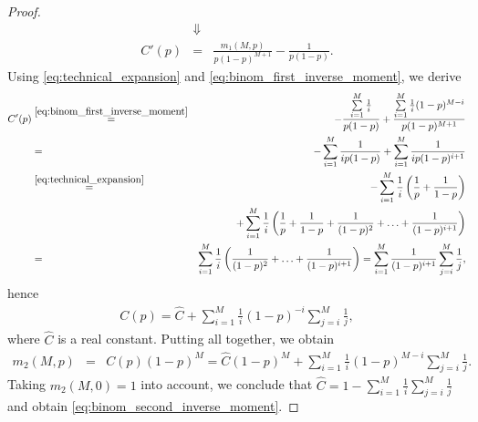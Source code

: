 \begin{proof}
\begin{eqnarray*}
        &\Downarrow&\\
        C'(p) &=& \frac{m_1(M,p)}{p(1-p)^{M+1}} - \frac{1}{p(1-p)}.
    \end{eqnarray*}
    Using \eqref{eq:technical_expansion} and \eqref{eq:binom_first_inverse_moment}, we derive
    \begin{eqnarray*}
        C'(p) &\overset{\eqref{eq:binom_first_inverse_moment}}{=}& -\frac{\sum\limits_{i=1}^M\frac{1}{i}}{p(1-p)} + \frac{\sum\limits_{i=1}^M\frac{1}{i}(1-p)^{M-i}}{p(1-p)^{M+1}}\\
        &=& -\sum\limits_{i=1}^M \frac{1}{ip(1-p)} + \sum\limits_{i=1}^M\frac{1}{ip(1-p)^{i+1}}\\
        &\overset{\eqref{eq:technical_expansion}}{=}& -\sum\limits_{i=1}^M\frac{1}{i}\left(\frac{1}{p} + \frac{1}{1-p}\right)\\
        &&\quad + \sum\limits_{i=1}^M\frac{1}{i}\left(\frac{1}{p} + \frac{1}{1-p} + \frac{1}{(1-p)^2} + \ldots + \frac{1}{(1-p)^{i+1}}\right)\\
        &=& \sum\limits_{i=1}^M\frac{1}{i}\left(\frac{1}{(1-p)^2} + \ldots + \frac{1}{(1-p)^{i+1}}\right) = \sum\limits_{i=1}^M \frac{1}{(1-p)^{i+1}}\sum\limits_{j=i}^M\frac{1}{j},
    \end{eqnarray*}
    hence 
    \begin{eqnarray*}
        C(p) = \hat{C} + \sum\limits_{i=1}^M\frac{1}{i}(1-p)^{-i}\sum\limits_{j=i}^M\frac{1}{j},
    \end{eqnarray*}
    where $\hat{C}$ is a real constant. Putting all together, we obtain
    \begin{eqnarray*}
        m_2(M,p) &=& C(p)(1-p)^M = \hat{C}(1-p)^M + \sum\limits_{i=1}^M\frac{1}{i}(1-p)^{M-i}\sum\limits_{j=i}^M\frac{1}{j}.
    \end{eqnarray*}
    Taking $m_2(M,0) = 1$ into account, we conclude that $\hat{C} = 1 - \sum_{i=1}^M\frac{1}{i}\sum_{j=i}^M\frac{1}{j}$ and obtain \eqref{eq:binom_second_inverse_moment}.
\end{proof}

